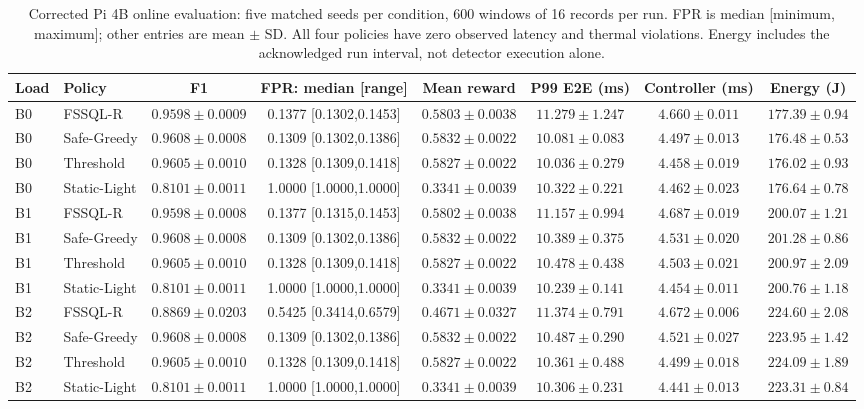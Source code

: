 \begin{table}[t]
\caption{Corrected Pi 4B online evaluation: five matched seeds per condition, 600 windows of 16 records per run. FPR is median [minimum, maximum]; other entries are mean $\pm$ SD. All four policies have zero observed latency and thermal violations. Energy includes the acknowledged run interval, not detector execution alone.}
\label{tab:pi4}
\centering\scriptsize
\setlength{\tabcolsep}{3pt}
\begin{tabular}{llcccccc}
\toprule
Load & Policy & F1 & FPR: median [range] & Mean reward & P99 E2E (ms) & Controller (ms) & Energy (J) \\
\midrule
B0 & FSSQL-R & $0.9598\pm0.0009$ & 0.1377 [0.1302,0.1453] & $0.5803\pm0.0038$ & $11.279\pm1.247$ & $4.660\pm0.011$ & $177.39\pm0.94$ \\
B0 & Safe-Greedy & $0.9608\pm0.0008$ & 0.1309 [0.1302,0.1386] & $0.5832\pm0.0022$ & $10.081\pm0.083$ & $4.497\pm0.013$ & $176.48\pm0.53$ \\
B0 & Threshold & $0.9605\pm0.0010$ & 0.1328 [0.1309,0.1418] & $0.5827\pm0.0022$ & $10.036\pm0.279$ & $4.458\pm0.019$ & $176.02\pm0.93$ \\
B0 & Static-Light & $0.8101\pm0.0011$ & 1.0000 [1.0000,1.0000] & $0.3341\pm0.0039$ & $10.322\pm0.221$ & $4.462\pm0.023$ & $176.64\pm0.78$ \\
\midrule
B1 & FSSQL-R & $0.9598\pm0.0008$ & 0.1377 [0.1315,0.1453] & $0.5802\pm0.0038$ & $11.157\pm0.994$ & $4.687\pm0.019$ & $200.07\pm1.21$ \\
B1 & Safe-Greedy & $0.9608\pm0.0008$ & 0.1309 [0.1302,0.1386] & $0.5832\pm0.0022$ & $10.389\pm0.375$ & $4.531\pm0.020$ & $201.28\pm0.86$ \\
B1 & Threshold & $0.9605\pm0.0010$ & 0.1328 [0.1309,0.1418] & $0.5827\pm0.0022$ & $10.478\pm0.438$ & $4.503\pm0.021$ & $200.97\pm2.09$ \\
B1 & Static-Light & $0.8101\pm0.0011$ & 1.0000 [1.0000,1.0000] & $0.3341\pm0.0039$ & $10.239\pm0.141$ & $4.454\pm0.011$ & $200.76\pm1.18$ \\
\midrule
B2 & FSSQL-R & $0.8869\pm0.0203$ & 0.5425 [0.3414,0.6579] & $0.4671\pm0.0327$ & $11.374\pm0.791$ & $4.672\pm0.006$ & $224.60\pm2.08$ \\
B2 & Safe-Greedy & $0.9608\pm0.0008$ & 0.1309 [0.1302,0.1386] & $0.5832\pm0.0022$ & $10.487\pm0.290$ & $4.521\pm0.027$ & $223.95\pm1.42$ \\
B2 & Threshold & $0.9605\pm0.0010$ & 0.1328 [0.1309,0.1418] & $0.5827\pm0.0022$ & $10.361\pm0.488$ & $4.499\pm0.018$ & $224.09\pm1.89$ \\
B2 & Static-Light & $0.8101\pm0.0011$ & 1.0000 [1.0000,1.0000] & $0.3341\pm0.0039$ & $10.306\pm0.231$ & $4.441\pm0.013$ & $223.31\pm0.84$ \\
\bottomrule
\end{tabular}
\end{table}
